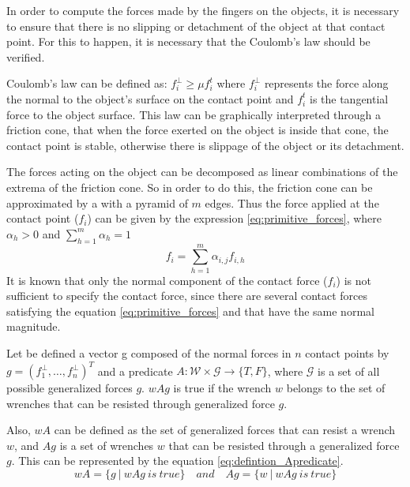 In order to compute the forces made by the fingers on the objects, it is necessary to ensure that there is no slipping or detachment of the object at that contact point.
For this to happen, it is necessary that the Coulomb's law should be verified.

Coulomb's law can be defined as: $f_i^{\bot} \ge \mu f_i^t$ where $f_i^{\bot}$ represents the force along the normal to the object's surface on the contact point and $ f_i^t$ is the tangential force to the object surface. 
This law can be graphically interpreted through a friction cone, that when the force exerted on the object is inside that cone, the contact point is stable, otherwise there is slippage of the object or its detachment.

The forces acting on the object can be decomposed as linear combinations of the extrema of the friction cone. So in order to do this, the friction cone can be approximated by a with a pyramid of $m$ edges.
Thus the force applied at the contact point ($f_i$) can be given by the expression \eqref{eq:primitive_forces}, where $\alpha_h > 0$ and $\sum_{h=1}^{m}\alpha_h = 1$
\begin{equation}\label{eq:primitive_forces}
    f_i= \sum_{h=1}^{m}\alpha_{i,j}f_{i,h}
\end{equation}
It is known that only the normal component of the contact force ($f_i$) is not sufficient to specify the contact force, since there are several contact forces satisfying the equation \eqref{eq:primitive_forces} and that have the same normal magnitude.

Let be defined a vector g composed of the normal forces in $n$ contact points by $g= (f_1^{\bot}, \dots, f_n^{\bot})^T $ and a predicate $A: \mathcal{W} \times \mathcal{G} \rightarrow \{T, F\}$, where $\mathcal{G}$ is a set of all possible generalized forces $g$. $wAg$ is true if the wrench $w$ belongs to the set of wrenches that can be resisted through generalized force $g$. 
\par
Also, $wA$ can be defined as the set of generalized forces that can resist a wrench $w$, and $Ag$ is a set of wrenches $w$ that can be resisted through a generalized force $g$. This can be represented by the equation \eqref{eq:defintion_Apredicate}.
\begin{equation}\label{eq:defintion_Apredicate}
    wA= \Big\{g\ |\ wAg\ is\ true \Big\} \quad and   \quad  Ag= \Big\{w\ |\ wAg\ is\ true \Big\}
\end{equation}

